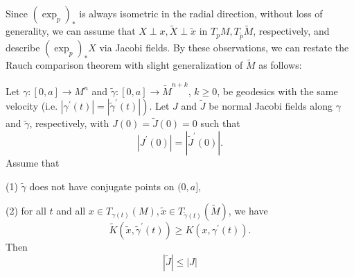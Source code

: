 \documentclass{ctexart}
\begin{document}
Since $(\exp_{p})_*$ is always isometric in the radial direction, without loss of generality, we can assume that $X \perp x, \widetilde{X} \perp \widetilde{x}$ 
in $T_pM, T_{\widetilde{p}}\widetilde{M}$, respectively, and describe $(\exp_{p})_* X$ via Jacobi fields. 
By these observations, we can restate the Rauch comparison theorem with slight generalization of $\widetilde{M}$ as follows:
\begin{theorem}\label{RCT}
  Let $\gamma:[0, a] \rightarrow M^n$ and $\tilde{\gamma}:[0, a] \rightarrow \tilde{M}^{n+k}$, $k \geq 0$, be geodesics with the same velocity 
  (i.e. $\left.\left|\gamma^{\prime}(t)\right|=\left|\tilde{\gamma}^{\prime}(t)\right|\right)$. 
  Let $J$ and $\tilde{J}$ be normal Jacobi fields along $\gamma$ and $\tilde{\gamma}$, respectively, with $J(0)=\tilde{J}(0)=0$ such that
  $$
  \left|J^{\prime}(0)\right|=\left|\tilde{J}^{\prime}(0)\right| .
  $$
  Assume that 

  (1) $\tilde{\gamma}$ does not have conjugate points on $(0, a]$, 

  (2) for all $t$ and all $x \in T_{\gamma(t)}(M), \tilde{x} \in T_{\tilde{\gamma}(t)}(\tilde{M})$, we have
  $$
  \tilde{K}\left(\tilde{x}, \tilde{\gamma}^{\prime}(t)\right) \geq K\left(x, \gamma^{\prime}(t)\right). 
  $$
  Then
  $$
  |\tilde{J}| \leq|J|
  $$
\end{theorem}
\end{document}
